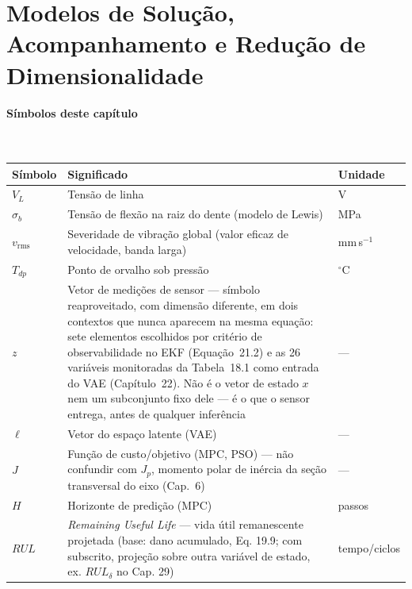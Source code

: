 \documentclass[12pt,a4paper]{article}
\numberwithin{equation}{section}
\numberwithin{table}{section}
\numberwithin{figure}{section}
\begin{document}
{\clearpage
\section{Modelos de Solução, Acompanhamento e Redução de Dimensionalidade}

\paragraph{Símbolos deste capítulo}\mbox{}\\[-0.5em]
{\small
\begin{longtable}{>{\raggedright\arraybackslash}p{2.6cm} >{\raggedright\arraybackslash}p{9.2cm} >{\raggedright\arraybackslash}p{2.6cm}}
	\toprule
	\textbf{Símbolo} & \textbf{Significado} & \textbf{Unidade} \\ \midrule
	\endhead
	$V_L$ & Tensão de linha & V \\
	$\sigma_b$ & Tensão de flexão na raiz do dente (modelo de Lewis) & MPa \\
	$v_{\text{rms}}$ & Severidade de vibração global (valor eficaz de velocidade, banda larga) & mm\,s$^{-1}$ \\
	$T_{dp}$ & Ponto de orvalho sob pressão & $^{\circ}$C \\
	$z$ & Vetor de medições de sensor — símbolo reaproveitado, com dimensão diferente, em dois contextos que nunca aparecem na mesma equação: sete elementos escolhidos por critério de observabilidade no EKF (Equação~21.2) e as 26 variáveis monitoradas da Tabela~18.1 como entrada do VAE (Capítulo~22). Não é o vetor de estado $x$ nem um subconjunto fixo dele — é o que o sensor entrega, antes de qualquer inferência & --- \\
	$\ell$\dag & Vetor do espaço latente (VAE) & --- \\
	$J$ & Função de custo/objetivo (MPC, PSO) — não confundir com $J_p$, momento polar de inércia da seção transversal do eixo (Cap.~6) & --- \\
	$H$ & Horizonte de predição (MPC) & passos \\
	$RUL$ & \textit{Remaining Useful Life} — vida útil remanescente projetada (base: dano acumulado, Eq. 19.9; com subscrito, projeção sobre outra variável de estado, ex. $RUL_\delta$ no Cap. 29) & tempo/ciclos \\
	\bottomrule
\end{longtable}
}

}
\end{document}
